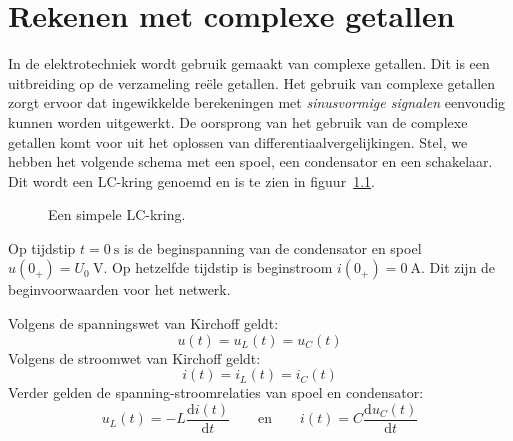 

\chapter{Rekenen met complexe getallen}
\label{cha:complex}
In de elektrotechniek wordt gebruik gemaakt van complexe getallen. Dit is een uitbreiding op de verzameling reële getallen. Het gebruik van complexe getallen zorgt ervoor dat ingewikkelde berekeningen met \textsl{sinusvormige signalen} eenvoudig kunnen worden uitgewerkt. De oorsprong van het gebruik van de complexe getallen komt voor uit het oplossen van differentiaalvergelijkingen.
\iffalse
Stel, we hebben het volgende schema met een spoel, een condensator en een schakelaar. Dit wordt een LC-kring genoemd en is te zien in figuur~\ref{fig:comlckring}.

\begin{figure}[!ht]
\centering
{}
\caption{Een simpele LC-kring.}
\label{fig:comlckring}
\end{figure}

Op tijdstip $t=\SI{0}{\second}$ is de beginspanning van de condensator en spoel $u(0_+)=U_0\ \si{\volt}$. Op hetzelfde tijdstip is beginstroom $i(0_+)=\SI{0}{\ampere}$. Dit zijn de beginvoorwaarden voor het netwerk.

Volgens de spanningswet van Kirchoff geldt:
\begin{equation}
u(t) = u_L(t) = u_C(t)
\end{equation}
%
Volgens de stroomwet van Kirchoff geldt:
%
\begin{equation}
i(t) = i_L(t) = i_C(t)
\end{equation}
%
Verder gelden de spanning-stroomrelaties van spoel en condensator:
%
\begin{equation}
u_L(t) = -L\dfrac{\mathrm{d}i(t)}{\mathrm{d}t} \qquad \text{en} \qquad i(t) = C\dfrac{\mathrm{d}u_C(t)}{\mathrm{d}t}
\end{equation}

